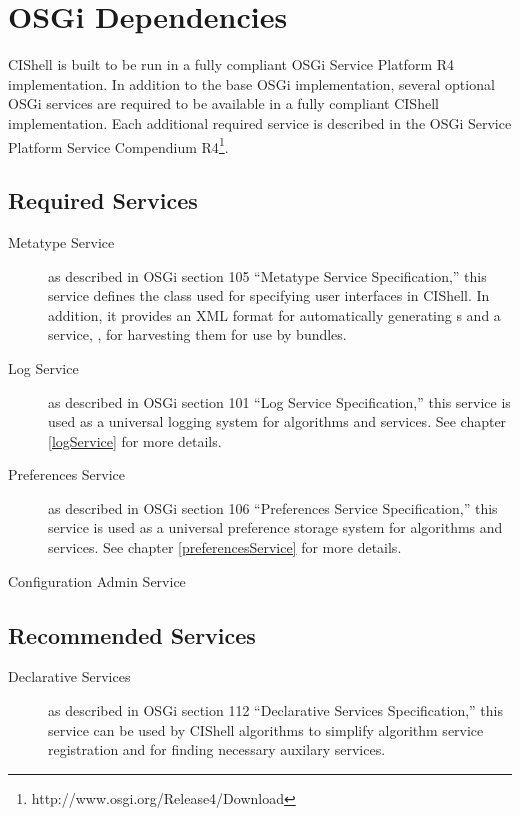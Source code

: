 \section{OSGi Dependencies}

CIShell is built to be run in a fully compliant OSGi Service Platform R4
implementation. In addition to the base OSGi implementation, several
optional OSGi services are required to be available in a fully compliant CIShell
implementation. Each additional required service is described in the OSGi
Service Platform Service Compendium
R4\footnote{http://www.osgi.org/Release4/Download}.

\subsection*{Required Services}
\begin{description}
  \item[Metatype Service] as described in OSGi section 105 ``Metatype Service
  Specification,'' this service defines the  class used
  for specifying user interfaces in CIShell. In addition, it provides an XML 
  format for automatically generating s and a service,
 , for harvesting them for use by bundles.
  \item[Log Service] as described in OSGi section 101 ``Log Service 
  Specification,'' this service is used as a universal logging system for 
  algorithms and services. See chapter \ref{logService} for more details.   
  \item[Preferences Service] as described in OSGi section 106 ``Preferences
  Service Specification,'' this service is used as a universal preference
  storage system for algorithms and services. See chapter \ref{preferencesService} for
  more details.
  \item[Configuration Admin Service] 
\end{description}

\subsection*{Recommended Services}
\begin{description}
  
  \item[Declarative Services] as described in OSGi section 112 ``Declarative
  Services Specification,'' this service can be used by CIShell algorithms to
  simplify algorithm service registration and for finding necessary auxilary services.\item[]
\end{description}
